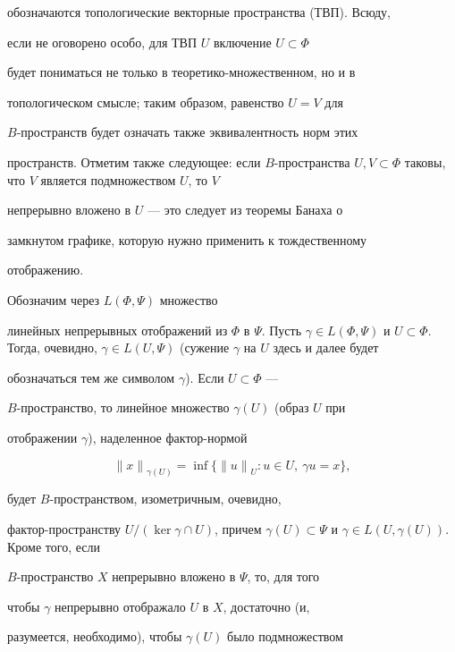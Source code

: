 обозначаются топологические векторные пространства (ТВП). Всюду,


если не оговорено особо, для ТВП $U$ включение $U \subset \Phi$


будет пониматься не только в теоретико-множественном, но и в


топологическом смысле; таким образом, равенство $U=V$ для


$B$-пространств будет означать также эквивалентность норм этих


пространств. Отметим также следующее: если $B$-пространства $U, V


\subset \Phi$ таковы, что $V$ является подмножеством $U$, то $V$


непрерывно вложено в $U$ --- это следует из теоремы Банаха о


замкнутом графике, которую нужно применить к тождественному


отображению.





Обозначим через $L(\Phi, \Psi)$ множество


линейных непрерывных отображений из $\Phi$ в $\Psi$. Пусть $\gamma


\in L(\Phi, \Psi)$ и $U \subset \Phi$. Тогда, очевидно, $\gamma


\in L(U, \Psi)$ (сужение $\gamma$ на $U$ здесь и далее будет


обозначаться тем же символом $\gamma$). Если $U \subset \Phi$ ---


$B$-пространство, то линейное множество $\gamma(U)$ (образ $U$ при


отображении $\gamma$), наделенное фактор-нормой


$$


{\|x\|}_{\gamma(U)} = \inf \{ {\|u\|}_U : u \in U,\ \gamma u=x \},


$$


будет $B$-пространством, изометричным, очевидно,


фактор-пространству $U/(\ker \gamma \cap U)$, причем $\gamma(U)


\subset \Psi$ и $\gamma \in L(U, \gamma(U))$. Кроме того, если


$B$-пространство $X$ непрерывно вложено в $\Psi$, то, для того


чтобы $\gamma$ непрерывно отображало $U$ в $X$, достаточно (и,


разумеется, необходимо), чтобы $\gamma(U)$ было подмножеством


